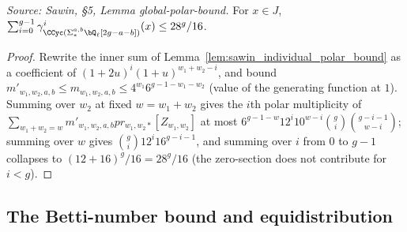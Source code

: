 \begin{lemma}
  \label{lem:sawin_global_polar_bound}
  \textit{Source: Sawin, §5, Lemma global-polar-bound.}
  For $x\in J$, $\sum_{i=0}^{g-1}\gamma^i_{\CCyc(\Sigma^{a,b}_*\bQ_\ell[2g-a-b])}(x)
  \le 28^g/16$.
\end{lemma}
\begin{proof}
  Rewrite the inner sum of Lemma~\ref{lem:sawin_individual_polar_bound} as a
  coefficient of $(1+2u)^i(1+u)^{w_1+w_2-i}$, and bound $m'_{w_1,w_2,a,b}\le
  m_{w_1,w_2,a,b}\le 4^{w_1}6^{g-1-w_1-w_2}$ (value of the generating function at
  $1$).  Summing over $w_2$ at fixed $w=w_1+w_2$ gives the $i$th polar multiplicity
  of $\sum_{w_1+w_2=w}m'_{w_1,w_2,a,b}pr_{w_1,w_2*}[Z_{w_1,w_2}]$ at most
  $6^{g-1-w}12^i10^{w-i}\binom{g}{i}\binom{g-i-1}{w-i}$; summing over $w$ gives
  $\binom{g}{i}12^i16^{g-i-1}$, and summing over $i$ from $0$ to $g-1$ collapses to
  $(12+16)^g/16=28^g/16$ (the zero-section does not contribute for $i<g$).
\end{proof}

\subsection{The Betti-number bound and equidistribution}

